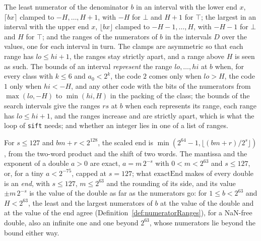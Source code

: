 \begin{definition}\label{def:numeratorRanges}
  \leanok
  The least numerator of the denominator $b$ in an interval with the lower end $x$,
  $\lceil b x \rceil$ clamped to $-H, \dots, H + 1$, with $-H$ for $\bot$ and $H + 1$ for $\top$;
  the largest in an interval with the upper end $x$, $\lfloor b x \rfloor$ clamped to
  $-H - 1, \dots, H$, with $-H - 1$ for $\bot$ and $H$ for $\top$; and the ranges of the numerators
  of $b$ in the intervals $D$ over the values, one for each interval in turn. The clamps are
  asymmetric so that each range has $\mathit{lo} \le \mathit{hi} + 1$, the ranges stay strictly
  apart, and a range above $H$ is seen as such. The bounds of an interval \emph{represent} the range
  $\mathit{lo}, \dots, \mathit{hi}$ at $b$ when, for every class with $k \le 6$ and $a_0 < 2^k$, the
  code $2$ comes only when $\mathit{lo} > H$, the code $1$ only when $\mathit{hi} < -H$, and any
  other code with the bits of the numerators from $\max(\mathit{lo}, -H)$ to $\min(\mathit{hi}, H)$
  in the packing of the class; the bounds of the search intervals give the ranges $\mathit{rs}$ at
  $b$ when each represents its range, each range has $\mathit{lo} \le \mathit{hi} + 1$, and the
  ranges increase and are strictly apart, which is what the loop of \verb|sift| needs; and whether
  an integer lies in one of a list of ranges.
\end{definition}

\begin{lemma}\label{lem:exactEnd}
  \leanok
  For $s \le 127$ and $b m + r < 2^{128}$, the scaled end is
  $\min(2^{64} - 1, \lfloor (b m + r)/2^s \rfloor)$, from the two-word product and the shift of two
  words. The mantissa and the exponent of a double $a > 0$ are exact, $a = m\,2^{-s}$ with
  $0 < m < 2^{63}$ and $s \le 127$, or, for a tiny $a < 2^{-75}$, capped at $s = 127$; what
  $\mathrm{exactEnd}$ makes of every double is an \emph{end}, with $s \le 127$, $m \le 2^{63}$ and
  the rounding of its side, and its value $\pm m\,2^{-s}$ is the value of the double as far as the
  numerators go: for $1 \le b < 2^{63}$ and $H < 2^{63}$, the least and the largest numerators of
  $b$ at the value of the double and at the value of the end agree
  (Definition~\ref{def:numeratorRanges}), for a NaN-free double, also an infinite one and one beyond
  $2^{63}$, whose numerators lie beyond the bound either way.
\end{lemma}


